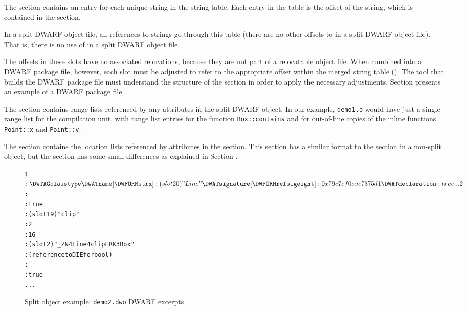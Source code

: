 The \dotdebugstroffsetsdwo{} section contains an entry for each
unique string in the string table. 
Each entry in the table is the offset of the string, which is
contained in the \dotdebugstrdwo{} section. 

In a split DWARF object file, all references to
strings go through this table (there are no
other offsets to \dotdebugstrdwo{} in a split
DWARF object file). That is, there
is no use of \DWFORMstrp{} in a split DWARF object file.

The offsets in these slots have no associated relocations, 
because they are not part of a relocatable object file.
When combined into a DWARF package file, however, each 
slot must be adjusted to refer to the appropriate offset 
within the merged string table (\dotdebugstrdwo{}).
The tool that builds the DWARF package file must understand 
the structure of the \dotdebugstroffsetsdwo{} section in 
order to apply the necessary adjustments. 
Section  presents
an example of a DWARF package file.

The \dotdebugrnglistsdwo{} section contains range lists referenced by any
\DWATranges{} attributes in the split DWARF object. In our example,
\texttt{demo1.o} would have just a single range list for the compilation unit,
with range list entries for the function \texttt{Box::contains} and for
out-of-line copies of the inline functions \texttt{Point::x} and \texttt{Point::y}.

The \dotdebugloclistsdwo{} section contains the location lists referenced
by \DWATlocation{} attributes in the \dotdebuginfodwo{} section. This
section has a similar format to the \dotdebugloclists{} section in a
non-split object, but 
\bb
the section
\eb
has some small differences as explained
in Section . 

\begin{figure}[b]
\begin{dwflisting}
\begin{alltt}

1$: \DWTAGclasstype
        \DWATname [\DWFORMstrx]: (slot 20) "Line"
        \DWATsignature [\DWFORMrefsigeight]: 0x79c7ef0eae7375d1
        \DWATdeclaration: true
        ...
2$:     \DWTAGsubprogram
            \DWATexternal: true
            \DWATname [\DWFORMstrx]: (slot 19) "clip"
            \DWATdeclfile: 2
            \DWATdeclline: 16
            \DWATlinkagename [\DWFORMstrx]: (slot 2) "_ZN4Line4clipERK3Box"
            \DWATtype: (reference to DIE for bool)
            \DWATaccessibility: \DWACCESSpublic
            \DWATdeclaration: true
        ...

\end{alltt}
\end{dwflisting}
\caption{Split object example: \texttt{demo2.dwo} DWARF \dotdebuginfodwo{} \mbox{excerpts}}
\label{fig:splitobjectexampledemotwodwodwarfdebuginfodwoexcerpts}
\end{figure}

